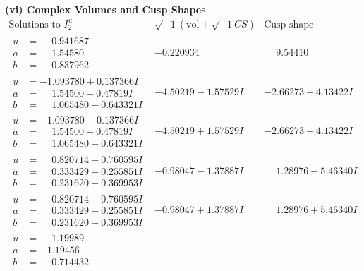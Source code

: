 \documentclass[1p]{elsarticle_modified}
\theoremstyle{definition}
\newcommand{\I}{\sqrt{-1}}
\begin{document}
\newpage\flushleft \textbf{(vi) Complex Volumes and Cusp Shapes}
$$\begin{array}{c|c|c}  
\text{Solutions to }I^u_{2}& \I (\text{vol} + \sqrt{-1}CS) & \text{Cusp shape}\\
 \hline 
\begin{aligned}
u &= \phantom{-}0.941687\phantom{ +0.000000I} \\
a &= \phantom{-}1.54580\phantom{ +0.000000I} \\
b &= \phantom{-}0.837962\phantom{ +0.000000I}\end{aligned}
 & -0.220934\phantom{ +0.000000I} & \phantom{-}9.54410\phantom{ +0.000000I} \\ \hline\begin{aligned}
u &= -1.093780 + 0.137366 I \\
a &= \phantom{-}1.54500 - 0.47819 I \\
b &= \phantom{-}1.065480 - 0.643321 I\end{aligned}
 & -4.50219 - 1.57529 I & -2.66273 + 4.13422 I \\ \hline\begin{aligned}
u &= -1.093780 - 0.137366 I \\
a &= \phantom{-}1.54500 + 0.47819 I \\
b &= \phantom{-}1.065480 + 0.643321 I\end{aligned}
 & -4.50219 + 1.57529 I & -2.66273 - 4.13422 I \\ \hline\begin{aligned}
u &= \phantom{-}0.820714 + 0.760595 I \\
a &= \phantom{-}0.333429 - 0.255851 I \\
b &= \phantom{-}0.231620 + 0.369953 I\end{aligned}
 & -0.98047 - 1.37887 I & \phantom{-}1.28976 - 5.46340 I \\ \hline\begin{aligned}
u &= \phantom{-}0.820714 - 0.760595 I \\
a &= \phantom{-}0.333429 + 0.255851 I \\
b &= \phantom{-}0.231620 - 0.369953 I\end{aligned}
 & -0.98047 + 1.37887 I & \phantom{-}1.28976 + 5.46340 I \\ \hline\begin{aligned}
u &= \phantom{-}1.19989\phantom{ +0.000000I} \\
a &= -1.19456\phantom{ +0.000000I} \\
b &= \phantom{-}0.714432\phantom{ +0.000000I}\end{aligned}

\end{array}$$
\end{document}
